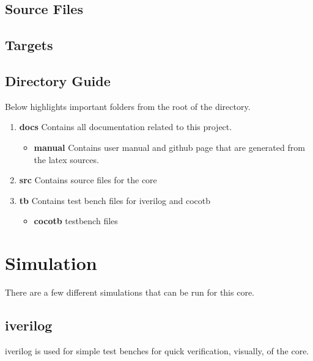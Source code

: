 \subsection{Source Files}



\subsection{Targets}



\subsection{Directory Guide}

\par
Below highlights important folders from the root of the directory.

\begin{enumerate}
  \item \textbf{docs} Contains all documentation related to this project.
    \begin{itemize}
      \item \textbf{manual} Contains user manual and github page that are generated from the latex sources.
    \end{itemize}
  \item \textbf{src} Contains source files for the core
  \item \textbf{tb} Contains test bench files for iverilog and cocotb
    \begin{itemize}
      \item \textbf{cocotb} testbench files
    \end{itemize}
\end{enumerate}

\newpage

\section{Simulation}
\par
There are a few different simulations that can be run for this core.

\subsection{iverilog}
\par
iverilog is used for simple test benches for quick verification, visually, of the core.

